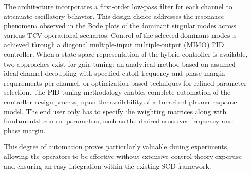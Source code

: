 The architecture incorporates a first-order low-pass filter for each channel to attenuate oscillatory behavior. This design choice addresses the resonance phenomena observed in the Bode plots of the dominant singular modes across various TCV operational scenarios. Control of the selected dominant modes is achieved through a diagonal multiple-input multiple-output (MIMO) PID controller. When a state-space representation of the hybrid controller is available, two approaches exist for gain tuning: an analytical method based on assumed ideal channel decoupling with specified cutoff frequency and phase margin requirements per channel, or optimization-based techniques for refined parameter selection. The PID tuning methodology enables complete automation of the controller design process, upon the availability of a linearized plasma response model. The end user only has to specify the weighting matrices along with fundamental control parameters, such as the desired crossover frequency and phase margin.

This degree of automation proves particularly valuable during experiments, allowing the operators to be effective without extensive control theory expertise and ensuring an easy integration within the existing SCD framework.
